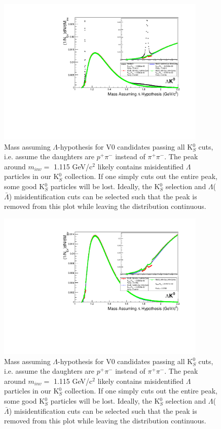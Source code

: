 \begin{figure}[h]
  \centering
  \includegraphics[width=100mm]{3_DataSelection/Figures/MassAssHypotheses/canMassAssLamHypCompare_LamK0_wNoMisID.pdf}
  \caption[$\Lambda$ contamination in K$^{0}_{S}$ collection]{Mass assuming $\Lambda$-hypothesis for V0 candidates passing all K$^{0}_{S}$ cuts, i.e. assume the daughters are $p^{+}\pi^{-}$ instead of $\pi^{+}\pi^{-}$.  The peak around $m_{inv} = $ 1.115 GeV/c$^{2}$ likely contains misidentified $\Lambda$ particles in our K$^{0}_{S}$ collection.  If one simply cuts out the entire peak, some good K$^{0}_{S}$ particles will be lost.  Ideally, the K$^{0}_{S}$ selection and $\Lambda$($\bar{\Lambda}$) misidentification cuts can be selected such that the peak is removed from this plot while leaving the distribution continuous.}
  \label{fig:MassAssLamHyp_wNoMisID}
\end{figure}

\begin{figure}[h]
  \centering
  \includegraphics[width=100mm]{3_DataSelection/Figures/MassAssHypotheses/canMassAssLamHypCompare_LamK0.pdf}
  \caption[$\Lambda$ contamination in K$^{0}_{S}$ collection]{Mass assuming $\Lambda$-hypothesis for V0 candidates passing all K$^{0}_{S}$ cuts, i.e. assume the daughters are $p^{+}\pi^{-}$ instead of $\pi^{+}\pi^{-}$.  The peak around $m_{inv} = $ 1.115 GeV/c$^{2}$ likely contains misidentified $\Lambda$ particles in our K$^{0}_{S}$ collection.  If one simply cuts out the entire peak, some good K$^{0}_{S}$ particles will be lost.  Ideally, the K$^{0}_{S}$ selection and $\Lambda$($\bar{\Lambda}$) misidentification cuts can be selected such that the peak is removed from this plot while leaving the distribution continuous.}
  \label{fig:MassAssLamHyp}
\end{figure}


